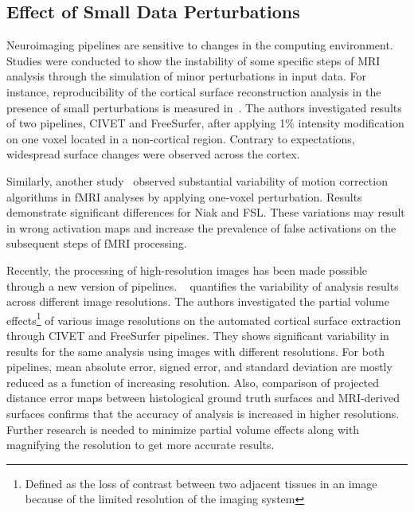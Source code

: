 \subsection{Effect of Small Data Perturbations}

Neuroimaging pipelines 
are sensitive to changes in the computing environment. 
Studies were conducted to show the instability of some specific 
steps of MRI analysis through the simulation of minor perturbations in 
input data. For instance, reproducibility of the cortical surface 
reconstruction analysis in the presence of small perturbations is 
measured in~\cite{Lindsay2017hbm}. The authors investigated results of two 
pipelines, CIVET and FreeSurfer, after applying 1\% intensity 
modification on one voxel located in a non-cortical region. Contrary to 
expectations, widespread surface changes were observed across the 
cortex. 

Similarly, another study~\cite{Glatard2018hbm} observed substantial 
variability of motion correction algorithms in fMRI analyses by 
applying one-voxel perturbation. Results demonstrate significant 
differences for Niak and FSL. These 
variations may result in wrong activation maps and increase the 
prevalence of false activations on the subsequent steps of fMRI 
processing. 

Recently, the processing of high-resolution images has been made possible 
through a new version of pipelines.
~\cite{Lindsay2018hbm} quantifies the variability of analysis results 
across different image resolutions. The authors investigated the 
partial volume effects\footnote{Defined as the loss of contrast between two adjacent tissues in an image
because of the limited resolution of the imaging system} of various image resolutions on the automated 
cortical surface extraction through CIVET and FreeSurfer pipelines. 
They shows significant variability in results for the same 
analysis using images with different resolutions. For both pipelines, 
mean absolute error, signed error, and standard deviation are mostly 
reduced as a function of increasing resolution. Also, comparison of 
projected distance error maps between histological ground truth 
surfaces and MRI-derived surfaces confirms that the accuracy of 
analysis is increased in higher resolutions. Further research is needed 
to minimize partial volume effects along with magnifying the resolution 
to get more accurate results. 


